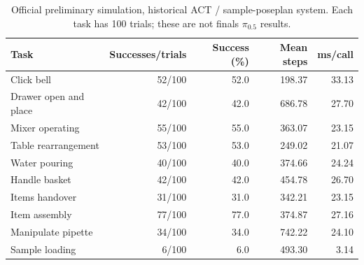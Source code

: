 \begin{table}[ht]
\centering\small
\caption{Official preliminary simulation, historical ACT / sample-poseplan system. Each task has 100 trials; these are not finals $\pi_{0.5}$ results.}
\label{tab:prelim}
\begin{tabular}{@{}lrrrr@{}}
\toprule
Task & Successes/trials & Success (\%) & Mean steps & ms/call \\
\midrule
Click bell & 52/100 & 52.0 & 198.37 & 33.13 \\
Drawer open and place & 42/100 & 42.0 & 686.78 & 27.70 \\
Mixer operating & 55/100 & 55.0 & 363.07 & 23.15 \\
Table rearrangement & 53/100 & 53.0 & 249.02 & 21.07 \\
Water pouring & 40/100 & 40.0 & 374.66 & 24.24 \\
Handle basket & 42/100 & 42.0 & 454.78 & 26.70 \\
Items handover & 31/100 & 31.0 & 342.21 & 23.15 \\
Item assembly & 77/100 & 77.0 & 374.87 & 27.16 \\
Manipulate pipette & 34/100 & 34.0 & 742.22 & 24.10 \\
Sample loading & 6/100 & 6.0 & 493.30 & 3.14 \\
\bottomrule
\end{tabular}
\end{table}

